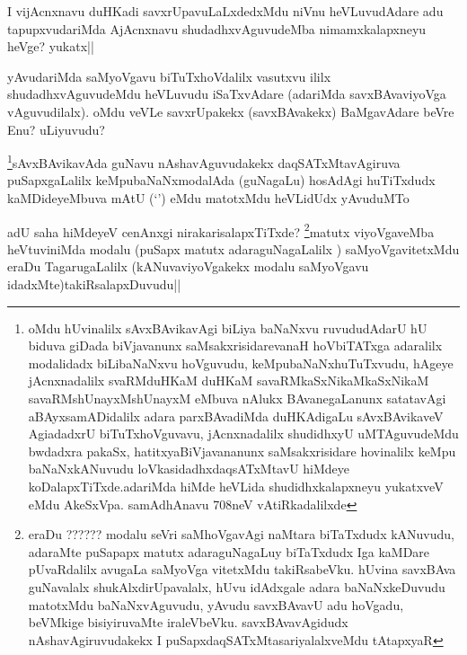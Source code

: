 \begin{artha}
I vijAcnxnavu duHKadi savxrUpavuLaLxdedxMdu niVnu heVLuvudAdare adu tapupxvudariMda AjAcnxnavu shudadhxvAguvudeMba nimamxkalapxneyu heVge? yukatx||
\end{artha}

\begin{artha}
yAvudariMda saMyoVgavu biTuTxhoVdalilx vasutxvu ililx shudadhxvAguvudeMdu heVLuvudu iSaTxvAdare (adariMda savxBAvaviyoVga vAguvudilalx). oMdu veVLe savxrUpakekx (savxBAvakekx) BaMgavAdare beVre Enu? uLiyuvudu?
\end{artha}

\begin{artha}
\footnote{oMdu hUvinalilx sAvxBAvikavAgi biLiya baNaNxvu ruvududAdarU hU biduva giDada biVjavanunx saMsakxrisidarevanaH hoVbiTATxga adaralilx modalidadx biLibaNaNxvu hoVguvudu, keMpubaNaNxhuTuTxvudu, hAgeye jAcnxnadalilx svaRMduHKaM duHKaM savaRMkaSxNikaMkaSxNikaM savaRMshUnayxMshUnayxM eMbuva nAlukx BAvanegaLanunx satatavAgi aBAyxsamADidalilx adara parxBAvadiMda duHKAdigaLu sAvxBAvikaveV AgiadadxrU biTuTxhoVguvavu, jAcnxnadalilx shudidhxyU uMTAguvudeMdu bwdadxra pakaSx, hatitxyaBiVjavananunx saMsakxrisidare hovinalilx keMpu baNaNxkANuvudu loVkasidadhxdaqsATxMtavU hiMdeye koDalapxTiTxde.adariMda hiMde heVLida shudidhxkalapxneyu yukatxveV eMdu AkeSxVpa. samAdhAnavu 708neV vAtiRkadalilxde}sAvxBAvikavAda guNavu nAshavAguvudakekx daqSATxMtavAgiruva puSapxgaLalilx keMpubaNaNxmodalAda (guNagaLu) hosAdAgi huTiTxdudx kaMDideyeMbuva mAtU (`\stext') eMdu matotxMdu heVLidUdx yAvuduMTo
\end{artha}

\begin{artha}
adU saha hiMdeyeV cenAnxgi nirakarisalapxTiTxde? \footnote{eraDu ?????? modalu seVri saMhoVgavAgi naMtara biTaTxdudx kANuvudu, adaraMte puSapapx matutx adaraguNagaLuy biTaTxdudx Iga kaMDare pUvaRdalilx avugaLa saMyoVga vitetxMdu takiRsabeVku. hUvina savxBAva guNavalalx shukAlxdirUpavalalx, hUvu idAdxgale adara baNaNxkeDuvudu matotxMdu baNaNxvAguvudu, yAvudu savxBAvavU adu hoVgadu, beVMkige bisiyiruvaMte iraleVbeVku. savxBAvavAgidudx nAshavAgiruvudakekx I puSapxdaqSATxMtasariyalalxveMdu tAtapxyaR}matutx viyoVgaveMba heVtuviniMda modalu (puSapx matutx adaraguNagaLalilx ) saMyoVgavitetxMdu eraDu TagarugaLalilx (kANuvaviyoVgakekx modalu saMyoVgavu idadxMte)takiRsalapxDuvudu||
\end{artha}

